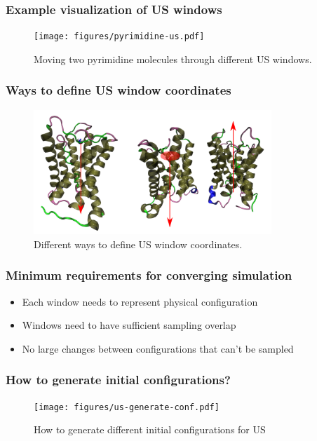 \documentclass{beamer}
\numberwithin{table}{section}
\numberwithin{figure}{section}
\numberwithin{equation}{section}
\begin{document}
\begin{frame}
\frametitle{Example visualization of US windows}
    \begin{figure}[htb]
        \centering
        \texttt{[image: figures/pyrimidine-us.pdf]}
        \caption{Moving two pyrimidine molecules through different US windows.}
    \end{figure}
\end{frame}

\begin{frame}
\frametitle{Ways to define US window coordinates}
    \begin{figure}[htb]
        \centering
        \includegraphics[keepaspectratio=true, width=0.8\textwidth]{figures/us-coord-define.pdf}
        \caption{Different ways to define US window coordinates.}
    \end{figure}
\end{frame}

\begin{frame}
\frametitle{Minimum requirements for converging simulation}
    \begin{itemize}
        \item{Each window needs to represent physical configuration}
        \item{Windows need to have sufficient sampling overlap}
        \item{No large changes between configurations that can't be sampled}
    \end{itemize}
\end{frame}

\begin{frame}
\frametitle{How to generate initial configurations?}
    \begin{figure}[htb]
        \centering
        \texttt{[image: figures/us-generate-conf.pdf]}
        \caption{How to generate different initial configurations for US}
    \end{figure}
\end{frame}
\end{document}
